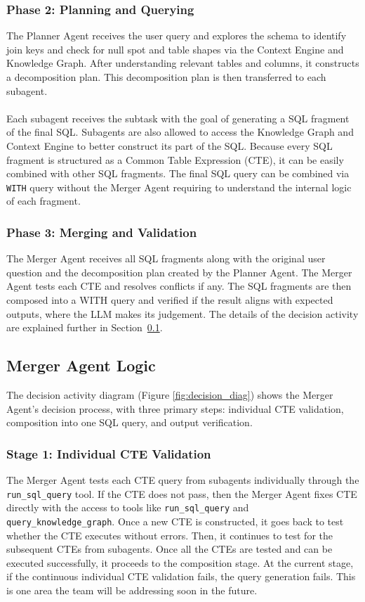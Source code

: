 \subsubsection{Phase 2: Planning and Querying}
The Planner Agent receives the user query and explores the schema to identify join keys and check for null spot and table shapes via the Context Engine and Knowledge Graph. After understanding relevant tables and columns, it constructs a decomposition plan. This decomposition plan is then transferred to each subagent. 
\\ \\
Each subagent receives the subtask with the goal of generating a SQL fragment of the final SQL. Subagents are also allowed to access the Knowledge Graph and Context Engine to better construct its part of the SQL. Because every SQL fragment is structured as a Common Table Expression (CTE), it can be easily combined with other SQL fragments. The final SQL query can be combined via \texttt{WITH} query without the Merger Agent requiring to understand the internal logic of each fragment.
\subsubsection{Phase 3: Merging and Validation}
The Merger Agent receives all SQL fragments along with the original user question and the decomposition plan created by the Planner Agent. The Merger Agent tests each CTE and resolves conflicts if any. The SQL fragments are then composed into a WITH query and verified if the result aligns with expected outputs, where the LLM makes its judgement. The details of the decision activity are explained further in Section~\ref{subsection:merger_agent}.
\subsection{Merger Agent Logic} \label{subsection:merger_agent}
The decision activity diagram (Figure \ref{fig:decision_diag}) shows the Merger Agent's decision process, with three primary steps: individual CTE validation, composition into one SQL query, and output verification.
\subsubsection{Stage 1: Individual CTE Validation}
The Merger Agent tests each CTE query from subagents individually through the \texttt{run\_sql\_query} tool. If the CTE does not pass, then the Merger Agent fixes CTE directly with the access to tools like \texttt{run\_sql\_query} and \texttt{query\_knowledge\_graph}. Once a new CTE is constructed, it goes back to test whether the CTE executes without errors. Then, it continues to test for the subsequent CTEs from subagents. Once all the CTEs are tested and can be executed successfully, it proceeds to the composition stage. At the current stage, if the continuous individual CTE validation fails, the query generation fails. This is one area the team will be addressing soon in the future. 
